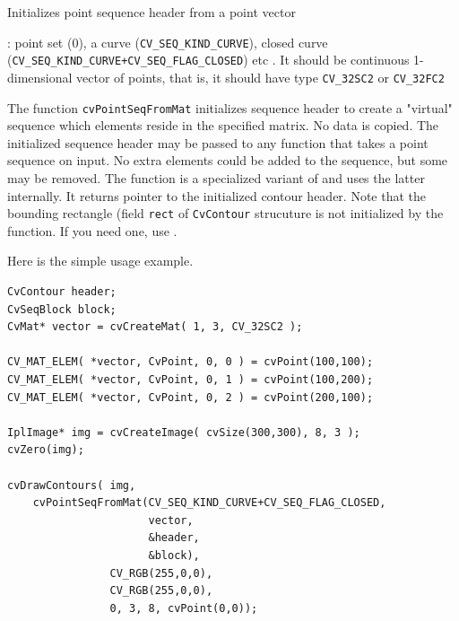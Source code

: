 \label{PointSeqFromMat}

Initializes point sequence header from a point vector


\begin{description}
: point set (0), a curve (\texttt{CV\_SEQ\_KIND\_CURVE}), closed curve (\texttt{CV\_SEQ\_KIND\_CURVE+CV\_SEQ\_FLAG\_CLOSED}) etc
. It should be continuous 1-dimensional vector of points, that is, it should have type \texttt{CV\_32SC2} or \texttt{CV\_32FC2}
\end{description}

The function \texttt{cvPointSeqFromMat} initializes sequence
header to create a "virtual" sequence which elements reside in
the specified matrix. No data is copied. The initialized sequence
header may be passed to any function that takes a point sequence
on input. No extra elements could be added to the sequence,
but some may be removed. The function is a specialized variant of
 and uses
the latter internally. It returns pointer to the initialized contour
header. Note that the bounding rectangle (field \texttt{rect} of
\texttt{CvContour} strucuture is not initialized by the function. If
you need one, use .

Here is the simple usage example.

\begin{lstlisting}
CvContour header;
CvSeqBlock block;
CvMat* vector = cvCreateMat( 1, 3, CV_32SC2 );

CV_MAT_ELEM( *vector, CvPoint, 0, 0 ) = cvPoint(100,100);
CV_MAT_ELEM( *vector, CvPoint, 0, 1 ) = cvPoint(100,200);
CV_MAT_ELEM( *vector, CvPoint, 0, 2 ) = cvPoint(200,100);

IplImage* img = cvCreateImage( cvSize(300,300), 8, 3 );
cvZero(img);

cvDrawContours( img,
    cvPointSeqFromMat(CV_SEQ_KIND_CURVE+CV_SEQ_FLAG_CLOSED,
                      vector,
                      &header,
                      &block),
                CV_RGB(255,0,0),
                CV_RGB(255,0,0),
                0, 3, 8, cvPoint(0,0));
\end{lstlisting}


